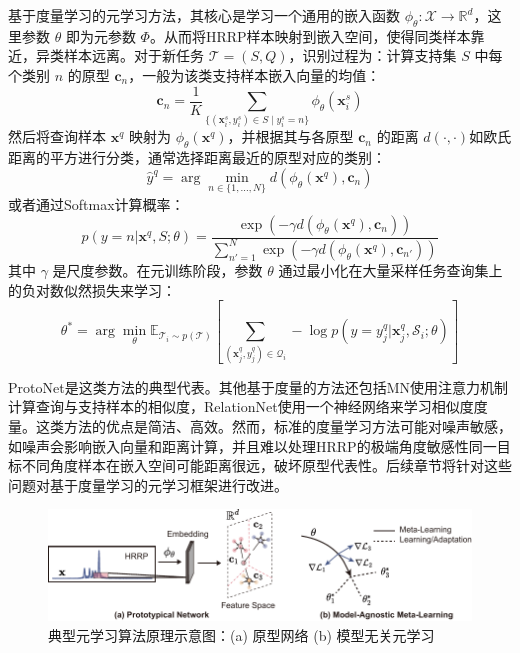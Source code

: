 基于度量学习的元学习方法，其核心是学习一个通用的嵌入函数 $\phi_\theta: \mathcal{X} \rightarrow \mathbb{R}^d$，这里参数 $\theta$ 即为元参数 $\Phi$。从而将HRRP样本映射到嵌入空间，使得同类样本靠近，异类样本远离。对于新任务 $\mathcal{T}=(S, Q)$，识别过程为：计算支持集 $S$ 中每个类别 $n$ 的原型 $\mathbf{c}_n$，一般为该类支持样本嵌入向量的均值：
\begin{equation}
    \mathbf{c}_n = \frac{1}{K} \sum_{\{(\mathbf{x}_i^s, y_i^s) \in S \mid y_i^s=n\}} \phi_\theta(\mathbf{x}_i^s)
    \label{eq:prototype_calculation}
\end{equation}
然后将查询样本 $\mathbf{x}^q$ 映射为 $\phi_\theta(\mathbf{x}^q)$，并根据其与各原型 $\mathbf{c}_n$ 的距离 $d(\cdot, \cdot)$如欧氏距离的平方进行分类，通常选择距离最近的原型对应的类别：
\begin{equation}
    \hat{y}^q = \arg\min_{n \in \{1, \dots, N\}} d(\phi_\theta(\mathbf{x}^q), \mathbf{c}_n)
    \label{eq:protonet_prediction_argmin}
\end{equation}
或者通过Softmax计算概率：
\begin{equation}
    p(y=n | \mathbf{x}^q, S; \theta) = \frac{\exp(-\gamma d(\phi_\theta(\mathbf{x}^q), \mathbf{c}_n))}{\sum_{n'=1}^{N} \exp(-\gamma d(\phi_\theta(\mathbf{x}^q), \mathbf{c}_{n'}))}
    \label{eq:protonet_prediction_softmax_gamma} %
\end{equation}
其中 $\gamma$ 是尺度参数。在元训练阶段，参数 $\theta$ 通过最小化在大量采样任务查询集上的负对数似然损失来学习：
\begin{equation}
    \theta^* = \arg\min_{\theta} \mathbb{E}_{\mathcal{T}_i \sim p(\mathcal{T})} \left[ \sum_{(\mathbf{x}_j^q, y_j^q) \in \mathcal{Q}_i} -\log p(y=y_j^q | \mathbf{x}_j^q, \mathcal{S}_i; \theta) \right]
    \label{eq:protonet_meta_objective}
\end{equation}

ProtoNet是这类方法的典型代表。其他基于度量的方法还包括MN使用注意力机制计算查询与支持样本的相似度，RelationNet使用一个神经网络来学习相似度度量。这类方法的优点是简洁、高效。然而，标准的度量学习方法可能对噪声敏感，如噪声会影响嵌入向量和距离计算，并且难以处理HRRP的极端角度敏感性同一目标不同角度样本在嵌入空间可能距离很远，破坏原型代表性。后续章节将针对这些问题对基于度量学习的元学习框架进行改进。

\begin{figure}[h]
    \centering
    \includegraphics[width=0.95\linewidth]{figures/proto_maml.pdf}
    \caption{典型元学习算法原理示意图：(a) 原型网络 (b) 模型无关元学习}
    \label{fig:protonet}
\end{figure}

